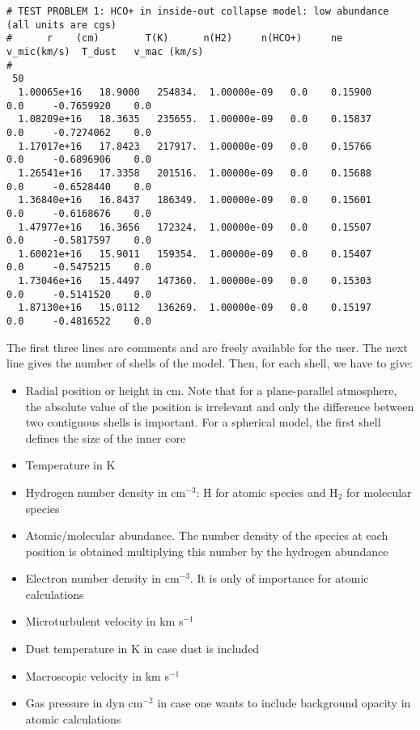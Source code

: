 \documentclass[12pt]{article}
\begin{document}
\begin{footnotesize}
\begin{footnotesize} \begin{verbatim}
# TEST PROBLEM 1: HCO+ in inside-out collapse model: low abundance (all units are cgs)
#      r	(cm)		T(K)	  n(H2)		n(HCO+)		ne		v_mic(km/s)  T_dust   v_mac (km/s)
#
 50
  1.00065e+16   18.9000   254834.  1.00000e-09   0.0	0.15900       0.0 	  -0.7659920	0.0
  1.08209e+16   18.3635   235655.  1.00000e-09   0.0	0.15837       0.0 	  -0.7274062	0.0
  1.17017e+16   17.8423   217917.  1.00000e-09   0.0	0.15766       0.0 	  -0.6896906	0.0
  1.26541e+16   17.3358   201516.  1.00000e-09   0.0	0.15688       0.0 	  -0.6528440	0.0
  1.36840e+16   16.8437   186349.  1.00000e-09   0.0	0.15601       0.0 	  -0.6168676	0.0
  1.47977e+16   16.3656   172324.  1.00000e-09   0.0	0.15507       0.0 	  -0.5817597	0.0
  1.60021e+16   15.9011   159354.  1.00000e-09   0.0	0.15407       0.0 	  -0.5475215	0.0
  1.73046e+16   15.4497   147360.  1.00000e-09   0.0	0.15303       0.0 	  -0.5141520	0.0
  1.87130e+16   15.0112   136269.  1.00000e-09   0.0	0.15197       0.0 	  -0.4816522	0.0
\end{verbatim} \end{footnotesize}
\end{footnotesize}
The first three lines are comments and are freely available for the
user. The next line gives the number of shells of the model. Then,
for each shell, we have to give:
\begin{itemize}
 \item Radial position or height in cm. Note that for a plane-parallel atmosphere, the
absolute value of the position is irrelevant and only the difference between
two contiguous shells is important. For a spherical model, the first shell defines
the size of the inner core
\item Temperature in K
\item Hydrogen number density in cm$^{-3}$: H for atomic species and H$_2$ for molecular species
\item Atomic/molecular abundance. The number density of the species at each position is obtained
multiplying this number by the hydrogen abundance
\item Electron number density in cm$^{-3}$. It is only of importance for atomic calculations
\item Microturbulent velocity in km s$^{-1}$
\item Dust temperature in K in case dust is included
\item Macroscopic velocity in km s$^{-1}$
\item Gas pressure in dyn cm$^{-2}$ in case one wants to include background opacity in atomic calculations
\end{itemize}
\end{document}
